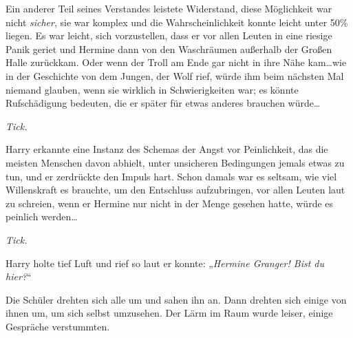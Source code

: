 Ein anderer Teil seines Verstandes leistete Widerstand, diese Möglichkeit war nicht \emph{sicher}, sie war komplex und die Wahrscheinlichkeit konnte leicht unter 50\% liegen. Es war leicht, sich vorzustellen, dass er vor allen Leuten in eine riesige Panik geriet und Hermine dann von den Waschräumen außerhalb der Großen Halle zurückkam. Oder wenn der Troll am Ende gar nicht in ihre Nähe kam…wie in der Geschichte von dem Jungen, der Wolf rief, würde ihm beim nächsten Mal niemand glauben, wenn sie wirklich in Schwierigkeiten war; es könnte Rufschädigung bedeuten, die er später für etwas anderes brauchen würde…

\emph{Tick.}

Harry erkannte eine Instanz des Schemas der Angst vor Peinlichkeit, das die meisten Menschen davon abhielt, unter unsicheren Bedingungen jemals etwas zu tun, und er zerdrückte den Impuls hart. Schon damals war es seltsam, wie viel Willenskraft es brauchte, um den Entschluss aufzubringen, vor allen Leuten laut zu schreien, wenn er Hermine nur nicht in der Menge gesehen hatte, würde es peinlich werden…

\emph{Tick.}

Harry holte tief Luft und rief so laut er konnte: „\emph{Hermine Granger! Bist du hier?}“

Die Schüler drehten sich alle um und sahen ihn an. Dann drehten sich einige von ihnen um, um sich selbst umzusehen. Der Lärm im Raum wurde leiser, einige Gespräche verstummten.

